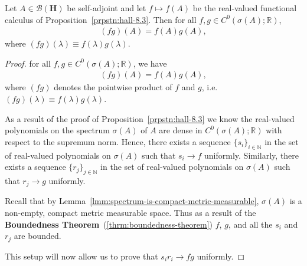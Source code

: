 \begin{proposition}
    \label{prpstn:cfc-multiplicative}
    \leanok
    Let $A \in \mathcal{B}(\mathbf{H})$ be self-adjoint and let $f \mapsto f(A)$ be the real-valued functional calculus of Proposition~\ref{prpstn:hall-8.3}. Then for all $f,g \in C^0(\sigma(A); \mathbb{R})$,
    \begin{align}
        (fg)(A) = f(A)g(A),
    \end{align}
    where $(fg)(\lambda) \equiv f(\lambda)g(\lambda)$.
\end{proposition}
\begin{proof}
    \leanok
for all $f,g \in C^0(\sigma(A); \mathbb{R})$, we have
\begin{align}
    (fg)(A) = f(A)g(A),
\end{align}
where $(fg)$ denotes the pointwise product of $f$ and $g$, i.e. $(fg)(\lambda) \equiv f(\lambda)g(\lambda)$.

As a result of the proof of Proposition~\ref{prpstn:hall-8.3} we know the real-valued polynomials on the spectrum $\sigma(A)$ of $A$ are dense in $C^0(\sigma(A); \mathbb{R})$ with respect to the supremum norm. Hence, there exists a sequence $\{ s_i \}_{i \in \mathbb{N}}$ in the set of real-valued polynomials on $\sigma(A)$ such that $s_i \rightarrow f$ uniformly. Similarly, there exists a sequence $\{ r_j \}_{j \in \mathbb{N}}$ in the set of real-valued polynomials on $\sigma(A)$ such that $r_j \rightarrow g$ uniformly.

Recall that by Lemma~\ref{lmm:spectrum-is-compact-metric-measurable}, $\sigma(A)$ is a non-empty, compact metric measurable space. Thus as a result of the \textbf{Boundedness Theorem}~(\ref{thrm:boundedness-theorem}) $f$, $g$, and all the $s_i$ and $r_j$ are bounded.

This setup will now allow us to prove that $s_i r_i \rightarrow fg$ uniformly.


\end{proof}
